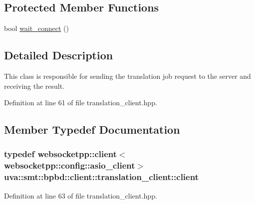 \subsection*{Protected Member Functions}
\begin{DoxyCompactItemize}
\item 
bool \hyperlink{classuva_1_1smt_1_1bpbd_1_1client_1_1translation__client_aedce4e9a9aae9858530f230d56c2733c}{wait\+\_\+connect} ()
\end{DoxyCompactItemize}


\subsection{Detailed Description}
This class is responsible for sending the translation job request to the server and receiving the result. 

Definition at line 61 of file translation\+\_\+client.\+hpp.



\subsection{Member Typedef Documentation}
\hypertarget{classuva_1_1smt_1_1bpbd_1_1client_1_1translation__client_a390fa2321ff9549e1f31ca2dcbd4a88c}{}
\subsubsection[{client}]{\setlength{\rightskip}{0pt plus 5cm}typedef websocketpp\+::client$<$websocketpp\+::config\+::asio\+\_\+client$>$ {\bf uva\+::smt\+::bpbd\+::client\+::translation\+\_\+client\+::client}}\label{classuva_1_1smt_1_1bpbd_1_1client_1_1translation__client_a390fa2321ff9549e1f31ca2dcbd4a88c}


Definition at line 63 of file translation\+\_\+client.\+hpp.

\hypertarget{classuva_1_1smt_1_1bpbd_1_1client_1_1translation__client_a6bb76738c95be98f5d13370d8e6a1176}{}
